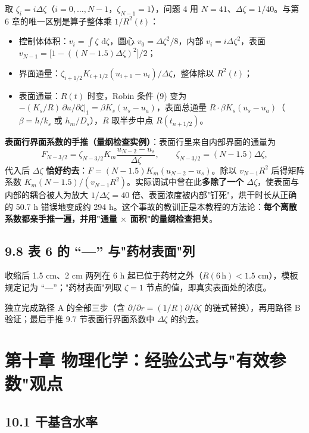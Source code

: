 \documentclass[12pt,a4paper]{ctexart}
\newcommand{\dd}{\,\mathrm{d}}
\newcommand{\handon}[1]{\par\smallskip\noindent{\heiti 【手推练习】}#1\par\smallskip}
\begin{document}
取 $\zeta_i=i\Delta\zeta$（$i=0,\dots,N-1$，$\zeta_{N-1}=1$），问题 4 用 $N=41$、$\Delta\zeta=1/40$。与第 6 章的唯一区别是算子整体乘 $1/R^2(t)$：
\begin{itemize}[leftmargin=2em]
\item 控制体体积：$v_i=\int\zeta\,\dd\zeta$，圆心 $v_0=\Delta\zeta^2/8$，内部 $v_i=i\Delta\zeta^2$，表面 $v_{N-1}=\bigl[1-((N-1.5)\Delta\zeta)^2\bigr]/2$；
\item 界面通量：$\zeta_{i+1/2}K_{i+1/2}(u_{i+1}-u_i)/\Delta\zeta$，整体除以 $R^2(t)$；
\item 表面通量：$R(t)$ 时变，Robin 条件 (9) 变为 $-(K_s/R)\,\partial u/\partial\zeta|_1=\beta K_s(u_s-u_a)$，表面总通量 $R\cdot\beta K_s(u_s-u_a)$（$\beta=h/k_s$ 或 $h_m/D_s$），$R$ 取半步中点 $R(t_{n+1/2})$。
\end{itemize}
\textbf{表面行界面系数的手推（量纲检查实例）}：表面行里来自内部界面的通量为
\begin{equation}
F_{N-3/2}=\zeta_{N-3/2}K_m\frac{u_{N-2}-u_s}{\Delta\zeta},
\qquad \zeta_{N-3/2}=(N-1.5)\Delta\zeta,
\end{equation}
代入后 $\Delta\zeta$ \textbf{恰好约去}：$F=(N-1.5)K_m(u_{N-2}-u_s)$。除以 $v_{N-1}R^2$ 后得矩阵系数 $K_m(N-1.5)/(v_{N-1}R^2)$。实际调试中曾在此\textbf{多除了一个 $\Delta\zeta$}，使表面与内部的耦合被人为放大 $1/\Delta\zeta=40$ 倍、表面浓度被内部"钉死"，烘干时长从正确的 50.7 h 错误地变成约 294 h。这个事故的教训正是本教程的方法论：\textbf{每个离散系数都亲手推一遍，并用"通量 $\times$ 面积"的量纲检查把关}。

\subsection{9.8 表 6 的 ``---'' 与"药材表面"列}

收缩后 1.5 cm、2 cm 两列在 6 h 起已位于药材之外（$R(6\,\mathrm{h})<1.5$ cm），模板规定记为 ``---''；"药材表面"列取 $\zeta=1$ 节点的值，即真实表面处的浓度。

\handon{独立完成路径 A 的全部三步（含 $\partial/\partial r=(1/R)\partial/\partial\zeta$ 的链式替换），再用路径 B 验证；最后手推 9.7 节表面行界面系数中 $\Delta\zeta$ 的约去。}

\section{第十章 物理化学：经验公式与"有效参数"观点}

\subsection{10.1 干基含水率}
\end{document}
